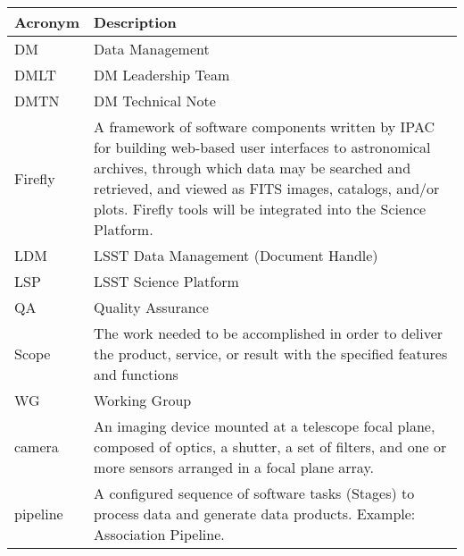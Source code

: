 \addtocounter{table}{-1}
\begin{longtable}{|l|p{}|}\hline
\textbf{Acronym} & \textbf{Description}  \\\hline

DM & \gls{Data Management} \\\hline
DMLT & DM Leadership Team \\\hline
DMTN & DM Technical Note \\\hline
Firefly & A framework of software components written by IPAC for building web-based user interfaces to astronomical archives, through which data may be searched and retrieved, and viewed as \gls{FITS} images, catalogs, and/or plots. Firefly tools will be integrated into the Science Platform. \\\hline
LDM & LSST Data Management (Document Handle) \\\hline
LSP & LSST Science Platform \\\hline
QA & Quality Assurance \\\hline
Scope & The work needed to be accomplished in order to deliver the product, service, or result with the specified features and functions \\\hline
WG & Working Group \\\hline
camera & An imaging device mounted at a telescope focal plane, composed of optics, a shutter, a set of filters, and one or more sensors arranged in a focal plane array. \\\hline
pipeline & A configured sequence of software tasks (Stages) to process data and generate data products. Example: Association Pipeline. \\\hline
\end{longtable}
